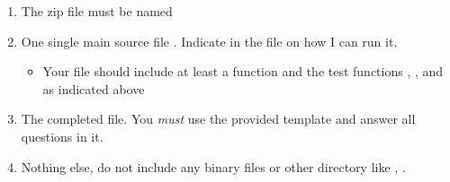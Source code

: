 \begin{enumerate}
\item The zip file must be named  
\item One single main source file . Indicate in the  file on how I can run it.
    \begin{itemize}
    \item Your file should include at least a  function and the test functions , , and  as indicated above
    \end{itemize}
\item The completed  file. You \emph{must} use the provided template and answer all questions in it.
\item Nothing else, do not include any binary files or other directory like , .
\end{enumerate}






